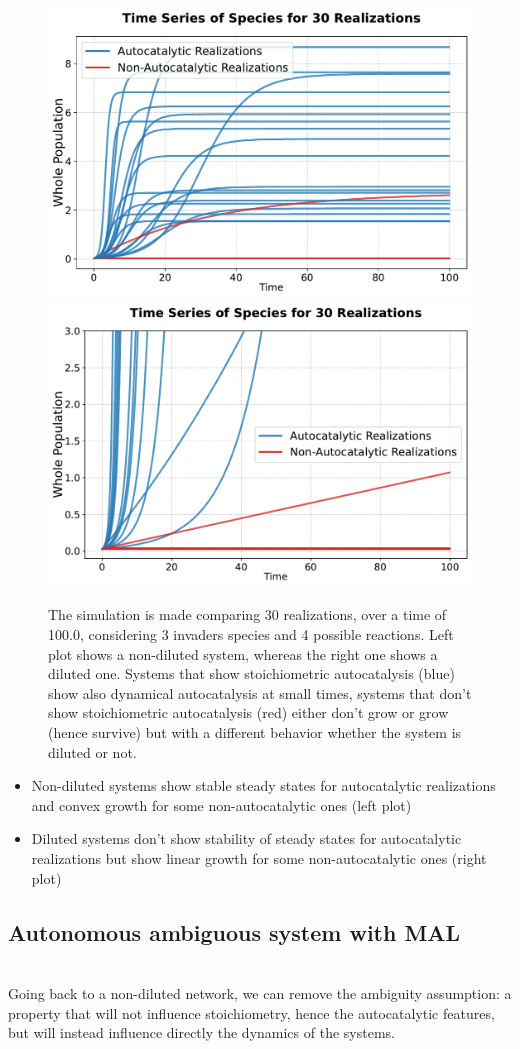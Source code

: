 \documentclass{article}
\begin{document}
\begin{figure}[H]
    \centering
    \includegraphics[width=0.45\linewidth]{traj_elegant.pdf} 
   \includegraphics[width=0.45\linewidth]{traj_dil_elegant.pdf} 
 \caption{\small{The simulation is made comparing 30 realizations, over a time of 100.0, considering 3 invaders species and 4 possible reactions. Left plot shows a non-diluted system, whereas the right one shows a diluted one. Systems that show stoichiometric autocatalysis (blue) show also dynamical autocatalysis at small times, systems that don't show stoichiometric autocatalysis (red) either don't grow or grow (hence survive) but with a different behavior whether the system is diluted or not.}}
   
    \label{Fig. B}
\end{figure}

\begin{itemize}
    \item Non-diluted systems show stable steady states for autocatalytic realizations and convex growth for some non-autocatalytic ones (left plot)
    \item Diluted systems don't show stability of steady states for autocatalytic realizations but show linear growth for some non-autocatalytic ones (right plot)
\end{itemize}



\subsection{Autonomous ambiguous system with MAL}
\\
Going back to a non-diluted network, we can remove the ambiguity assumption: a property that will not influence stoichiometry, hence the autocatalytic features, but will instead influence directly the dynamics of the systems.
\end{document}
